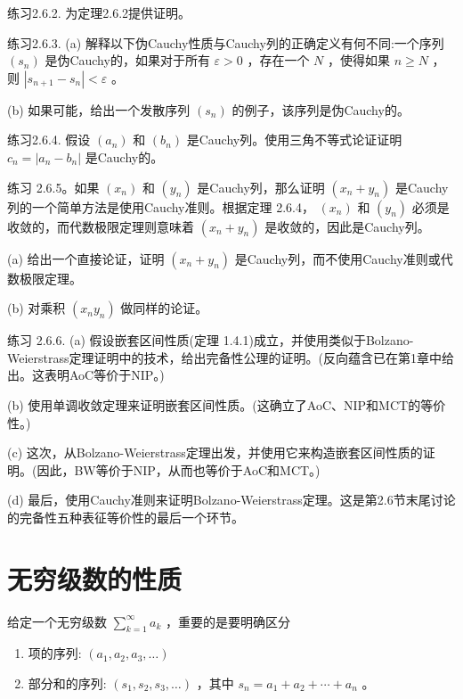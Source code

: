练习2.6.2. 为定理2.6.2提供证明。

练习2.6.3. (a) 解释以下伪Cauchy性质与Cauchy列的正确定义有何不同:一个序列 \(\left( {s}_{n}\right)\) 是伪Cauchy的，如果对于所有 \(\varepsilon  > 0\) ，存在一个 \(N\) ，使得如果 \(n \geq  N\) ，则 \(\left| {{s}_{n + 1} - {s}_{n}}\right|  < \varepsilon\) 。

(b) 如果可能，给出一个发散序列 \(\left( {s}_{n}\right)\) 的例子，该序列是伪Cauchy的。

练习2.6.4. 假设 \(\left( {a}_{n}\right)\) 和 \(\left( {b}_{n}\right)\) 是Cauchy列。使用三角不等式论证证明 \({c}_{n} = \left| {{a}_{n} - {b}_{n}}\right|\) 是Cauchy的。

练习 2.6.5。如果 \(\left( {x}_{n}\right)\) 和 \(\left( {y}_{n}\right)\) 是Cauchy列，那么证明 \(\left( {{x}_{n} + {y}_{n}}\right)\) 是Cauchy列的一个简单方法是使用Cauchy准则。根据定理 2.6.4， \(\left( {x}_{n}\right)\) 和 \(\left( {y}_{n}\right)\) 必须是收敛的，而代数极限定理则意味着 \(\left( {{x}_{n} + {y}_{n}}\right)\) 是收敛的，因此是Cauchy列。

(a) 给出一个直接论证，证明 \(\left( {{x}_{n} + {y}_{n}}\right)\) 是Cauchy列，而不使用Cauchy准则或代数极限定理。

(b) 对乘积 \(\left( {{x}_{n}{y}_{n}}\right)\) 做同样的论证。

练习 2.6.6. (a) 假设嵌套区间性质(定理 1.4.1)成立，并使用类似于Bolzano-Weierstrass定理证明中的技术，给出完备性公理的证明。(反向蕴含已在第1章中给出。这表明AoC等价于NIP。)

(b) 使用单调收敛定理来证明嵌套区间性质。(这确立了AoC、NIP和MCT的等价性。)

(c) 这次，从Bolzano-Weierstrass定理出发，并使用它来构造嵌套区间性质的证明。(因此，BW等价于NIP，从而也等价于AoC和MCT。)

(d) 最后，使用Cauchy准则来证明Bolzano-Weierstrass定理。这是第2.6节末尾讨论的完备性五种表征等价性的最后一个环节。

\section{无穷级数的性质}
\label{sec:2.7}
给定一个无穷级数 \(\mathop{\sum }\limits_{{k = 1}}^{\infty }{a}_{k}\) ，重要的是要明确区分
\begin{enumerate}[label = (\roman*)]
\item 项的序列: \(\left( {{a}_{1},{a}_{2},{a}_{3},\ldots }\right)\) 
\item 部分和的序列: \(\left( {{s}_{1},{s}_{2},{s}_{3},\ldots }\right)\) ，其中 \({s}_{n} = {a}_{1} + {a}_{2} + \cdots  + {a}_{n}\) 。
\end{enumerate}

